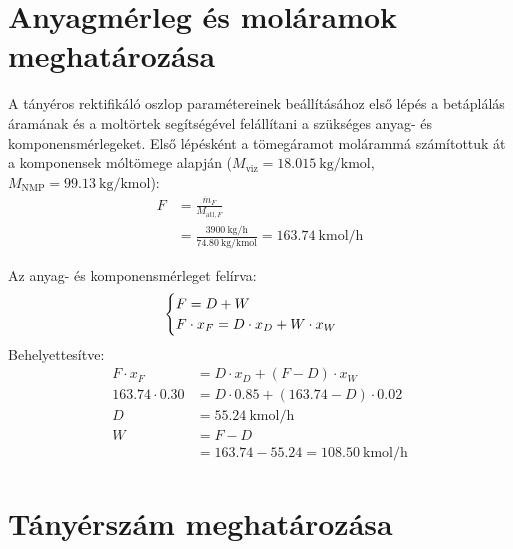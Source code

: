 \section{Anyagmérleg és moláramok meghatározása}\label{sec:agkompmerl}

A tányéros rektifikáló oszlop paramétereinek beállításához első lépés
a betáplálás áramának és a moltörtek segítségével felállítani a
szükséges anyag- és komponensmérlegeket.
Első lépésként a tömegáramot molárammá számítottuk át a komponensek
móltömege alapján ($M_{\text{viz}} = \qty{18.015}{\kg\per\kmol}$, $M_{\text{NMP}} =
\qty{99.13}{\kg\per\kmol}$)\autocite{linstromNISTChemistryWebBook1997}:
\begin{equation}
  \begin{split}
    F &= \frac{\dot{m}_F}{M_{\text{atl},F}} \\
    &= \frac{\qty{3900}{\kg\per\hour}}{\qty{74.80}{\kg\per\kmol}} =
    \qty{163.74}{\kmol\per\hour}
  \end{split}
\end{equation}

Az anyag- és komponensmérleget felírva:
\begin{equation}
  \begin{cases}
    F = D + W\\
    F \cdot x_F = D \cdot x_D + W \cdot x_W
  \end{cases}\\
\end{equation}
Behelyettesítve:
\begin{equation}
  \begin{split}
    F \cdot x_F &= D \cdot x_D + (F - D) \cdot x_W\\
    \num{163.74} \cdot \num{0.30} &= D \cdot \num{0.85} + (\num{163.74} - D) \cdot \num{0.02}\\
    D &= \qty{55.24}{\kmol\per\hour}\\
    W &= F - D \\
    &= \num{163.74} - \num{55.24} = \qty{108.50}{\kmol\per\hour}
  \end{split}
\end{equation}

\section{Tányérszám meghatározása}

